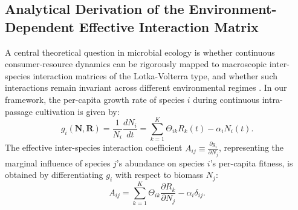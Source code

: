 \subsection{Analytical Derivation of the Environment-Dependent Effective Interaction Matrix}
\label{sec:interaction_matrix}

A central theoretical question in microbial ecology is whether continuous consumer-resource dynamics can be rigorously mapped to macroscopic inter-species interaction matrices of the Lotka-Volterra type, and whether such interactions remain invariant across different environmental regimes \citep{macarthur1970species, case2000illustrated}. In our framework, the per-capita growth rate of species $i$ during continuous intra-passage cultivation is given by:
\begin{equation}
    g_i(\mathbf{N}, \mathbf{R}) = \frac{1}{N_i}\frac{dN_i}{dt} = \sum_{k=1}^K \Theta_{ik} R_k(t) - \alpha_i N_i(t).
\end{equation}
The effective inter-species interaction coefficient $A_{ij} \equiv \frac{\partial g_i}{\partial N_j}$, representing the marginal influence of species $j$'s abundance on species $i$'s per-capita fitness, is obtained by differentiating $g_i$ with respect to biomass $N_j$:
\begin{equation}
    \label{eq:interaction_definition}
    A_{ij} = \sum_{k=1}^K \Theta_{ik} \frac{\partial R_k}{\partial N_j} - \alpha_i \delta_{ij}.
\end{equation}

